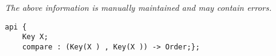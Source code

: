 \label{api:Keyx}

{\tiny \it The above information is manually maintained and may contain errors.}
\begin{verbatim}
api {
    Key X;
    compare : (Key(X ) , Key(X )) -> Order;};
\end{verbatim}
